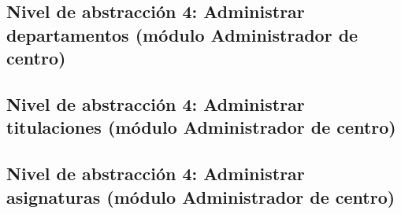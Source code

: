 \subsection{Nivel de abstracción 4: Administrar departamentos (módulo Administrador de centro)}



\subsection{Nivel de abstracción 4: Administrar titulaciones (\-mó\-dulo Administrador de centro)}



\subsection{Nivel de abstracción 4: Administrar asignaturas (\-mó\-dulo Administrador de centro)}



%
% 
%
%
% 